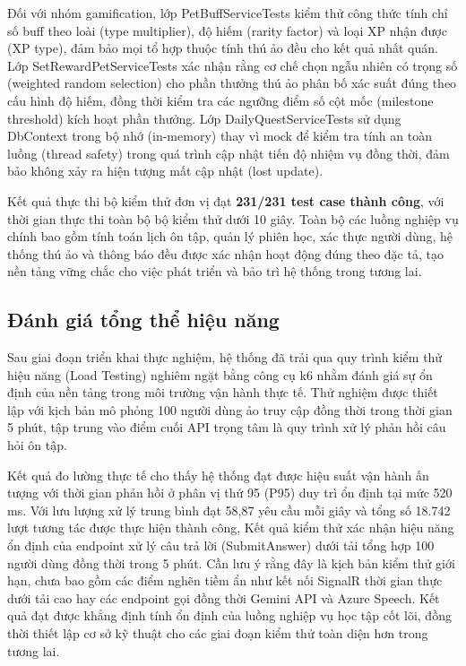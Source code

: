 Đối với nhóm gamification, lớp PetBuffServiceTests kiểm thử công thức tính chỉ số buff theo loài (type multiplier), độ hiếm (rarity factor) và loại XP nhận được (XP type), đảm bảo mọi tổ hợp thuộc tính thú ảo đều cho kết quả nhất quán. Lớp SetRewardPetServiceTests xác nhận rằng cơ chế chọn ngẫu nhiên có trọng số (weighted random selection) cho phần thưởng thú ảo phân bố xác suất đúng theo cấu hình độ hiếm, đồng thời kiểm tra các ngưỡng điểm số cột mốc (milestone threshold) kích hoạt phần thưởng. Lớp DailyQuestServiceTests sử dụng DbContext trong bộ nhớ (in-memory) thay vì mock để kiểm tra tính an toàn luồng (thread safety) trong quá trình cập nhật tiến độ nhiệm vụ đồng thời, đảm bảo không xảy ra hiện tượng mất cập nhật (lost update).

Kết quả thực thi bộ kiểm thử đơn vị đạt \textbf{231/231 test case thành công}, với thời gian thực thi toàn bộ bộ kiểm thử dưới 10 giây. Toàn bộ các luồng nghiệp vụ chính bao gồm tính toán lịch ôn tập, quản lý phiên học, xác thực người dùng, hệ thống thú ảo và thông báo đều được xác nhận hoạt động đúng theo đặc tả, tạo nền tảng vững chắc cho việc phát triển và bảo trì hệ thống trong tương lai.

\subsection{Đánh giá tổng thể hiệu năng}

Sau giai đoạn triển khai thực nghiệm, hệ thống đã trải qua quy trình kiểm thử hiệu năng (Load Testing) nghiêm ngặt bằng công cụ k6 nhằm đánh giá sự ổn định của nền tảng trong môi trường vận hành thực tế. Thử nghiệm được thiết lập với kịch bản mô phỏng 100 người dùng ảo truy cập đồng thời trong thời gian 5 phút, tập trung vào điểm cuối API trọng tâm là quy trình xử lý phản hồi câu hỏi ôn tập.

Kết quả đo lường thực tế cho thấy hệ thống đạt được hiệu suất vận hành ấn tượng với thời gian phản hồi ở phân vị thứ 95 (P95) duy trì ổn định tại mức 520 ms. Với lưu lượng xử lý trung bình đạt 58,87 yêu cầu mỗi giây và tổng số 18.742 lượt tương tác được thực hiện thành công, Kết quả kiểm thử xác nhận hiệu năng ổn định của endpoint xử lý câu trả lời (SubmitAnswer) dưới tải tổng hợp 100 người dùng đồng thời trong 5 phút. Cần lưu ý rằng đây là kịch bản kiểm thử giới hạn, chưa bao gồm các điểm nghẽn tiềm ẩn như kết nối SignalR thời gian thực dưới tải cao hay các endpoint gọi đồng thời Gemini API và Azure Speech. Kết quả đạt được khẳng định tính ổn định của luồng nghiệp vụ học tập cốt lõi, đồng thời thiết lập cơ sở kỹ thuật cho các giai đoạn kiểm thử toàn diện hơn trong tương lai.

